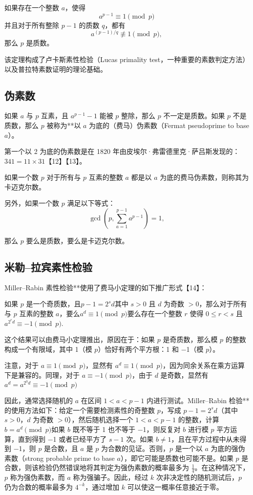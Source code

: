 如果存在一个整数 $a$，使得
$$
a^{p-1} \equiv 1 \pmod{p}~
$$
并且对于所有整除 $p - 1$ 的质数 $q$，都有
$$
a^{(p-1)/q} \not\equiv 1 \pmod{p},~
$$
那么 $p$ 是质数。

该定理构成了卢卡斯素性检验（Lucas primality test，一种重要的素数判定方法）以及普拉特素数证明的理论基础。
\subsection{伪素数}
如果 $a$ 与 $p$ 互素，且 $a^{p-1} - 1$ 能被 $p$ 整除，那么 $p$ 不一定是质数。如果 $p$ 不是质数，那么 $p$ 被称为**以 $a$ 为底的（费马）伪素数（Fermat pseudoprime to base $a$）。

第一个以 2 为底的伪素数是在 1820 年由皮埃尔·弗雷德里克·萨吕斯发现的：$341 = 11 \times 31$【12】【13】。  

如果一个数 \( p \) 对于所有与 \( p \) 互素的整数 \( a \) 都是以 \( a \) 为底的费马伪素数，则称其为卡迈克尔数。  

另外，如果一个数 \( p \) 满足以下等式：  
$$
\gcd\left(p, \sum_{a=1}^{p-1} a^{p-1}\right) = 1,~
$$

那么 $p$ 要么是质数，要么是卡迈克尔数。
\subsection{米勒–拉宾素性检验}

Miller–Rabin 素性检验**使用了费马小定理的如下推广形式【14】：

如果 $p$ 是一个奇质数，且$p - 1 = 2^s d$其中 $s > 0$ 且 $d$ 为奇数 $>0$，那么对于所有与 $p$ 互素的整数 $a$，要么$a^d \equiv 1 \pmod{p}$要么存在一个整数 $r$ 使得 $0 \le r < s$ 且$a^{2^r d} \equiv -1 \pmod{p}$.

这个结果可以由费马小定理推出，原因在于：如果 $p$ 是奇质数，那么模 $p$ 的整数构成一个有限域，其中 1（模 $p$）恰好有两个平方根：1 和 −1（模 $p$）。

注意，对于 $a \equiv 1 \pmod{p}$，显然有 $a^d \equiv 1 \pmod{p}$，因为同余关系在乘方运算下是兼容的。同理，对于 $a \equiv -1 \pmod{p}$，由于 $d$ 是奇数，显然有$a^d = a^{2^0 d} \equiv -1 \pmod{p}$

因此，通常选择随机的 $a$ 在区间 $1 < a < p - 1$ 内进行测试。Miller–Rabin 检验**的使用方法如下：给定一个需要检测素性的奇整数 $p$，写成 $p - 1 = 2^s d$（其中 $s > 0$，$d$ 为奇数 $> 0$），然后随机选择一个 $1 < a < p - 1$ 的整数，计算$b = a^d \pmod{p}$如果 $b$ 既不等于 1 也不等于 −1，则反复对 $b$ 进行模 $p$ 平方运算，直到得到 −1 或者已经平方了 $s - 1$ 次。如果 $b \neq 1$，且在平方过程中从未得到 −1，则 $p$ 是合数，且 $a$ 是 $p$ 为合数的见证。否则，$p$ 是一个以 $a$ 为底的强伪素数（strong probable prime to base $a$），即它可能是质数也可能不是。如果 $p$ 是合数，则该检验仍然错误地将其判定为强伪素数的概率最多为 $\frac14$。在这种情况下，$p$ 称为强伪素数，而 $a$ 称为强骗子。因此，经过 $k$ 次非决定性的随机测试后，$p$ 仍为合数的概率最多为 $4^{-k}$，通过增加 $k$ 可以使这一概率任意接近于零。

